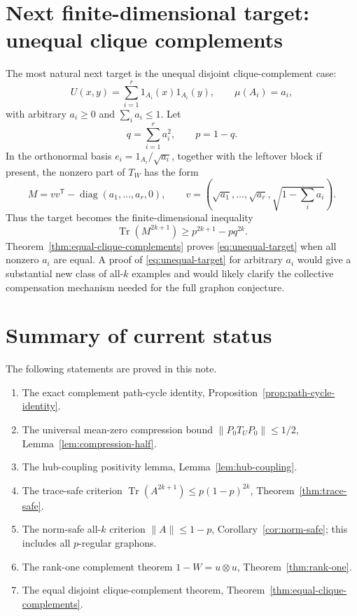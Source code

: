\documentclass[11pt]{article}
\theoremstyle{definition}
\theoremstyle{remark}
\newcommand{\Tr}{\operatorname{Tr}}
\newcommand{\0}{\mathbf 0}
\begin{document}
\section{Next finite-dimensional target: unequal clique complements}

The most natural next target is the unequal disjoint clique-complement case:
\[
        U(x,y)=\sum_{i=1}^r1_{A_i}(x)1_{A_i}(y),
        \qquad
        \mu(A_i)=a_i,
\]
with arbitrary $a_i\ge0$ and $\sum_i a_i\le1$.  Let
\[
        q=\sum_{i=1}^r a_i^2,
        \qquad
        p=1-q.
\]
In the orthonormal basis $e_i=1_{A_i}/\sqrt{a_i}$, together with the leftover block if present, the nonzero part of $T_W$ has the form
\[
        M=vv^{\mathsf T}-\operatorname{diag}(a_1,\ldots,a_r,0),
        \qquad
        v=(\sqrt{a_1},\ldots,\sqrt{a_r},\sqrt{1-\sum_i a_i}).
\]
Thus the target becomes the finite-dimensional inequality
\begin{equation}\label{eq:unequal-target}
        \Tr(M^{2k+1})
        \ge
        p^{2k+1}-p q^{2k}.
\end{equation}
Theorem~\ref{thm:equal-clique-complements} proves \eqref{eq:unequal-target} when all nonzero $a_i$ are equal.  A proof of \eqref{eq:unequal-target} for arbitrary $a_i$ would give a substantial new class of all-$k$ examples and would likely clarify the collective compensation mechanism needed for the full graphon conjecture.

\section{Summary of current status}

The following statements are proved in this note.
\begin{enumerate}[label=(\roman*)]
\item The exact complement path-cycle identity, Proposition~\ref{prop:path-cycle-identity}.
\item The universal mean-zero compression bound $\|P_0T_UP_0\|\le1/2$, Lemma~\ref{lem:compression-half}.
\item The hub-coupling positivity lemma, Lemma~\ref{lem:hub-coupling}.
\item The trace-safe criterion $\Tr(A^{2k+1})\le p(1-p)^{2k}$, Theorem~\ref{thm:trace-safe}.
\item The norm-safe all-$k$ criterion $\|A\|\le1-p$, Corollary~\ref{cor:norm-safe}; this includes all $p$-regular graphons.
\item The rank-one complement theorem $1-W=u\otimes u$, Theorem~\ref{thm:rank-one}.
\item The equal disjoint clique-complement theorem, Theorem~\ref{thm:equal-clique-complements}.
\end{enumerate}
\end{document}
